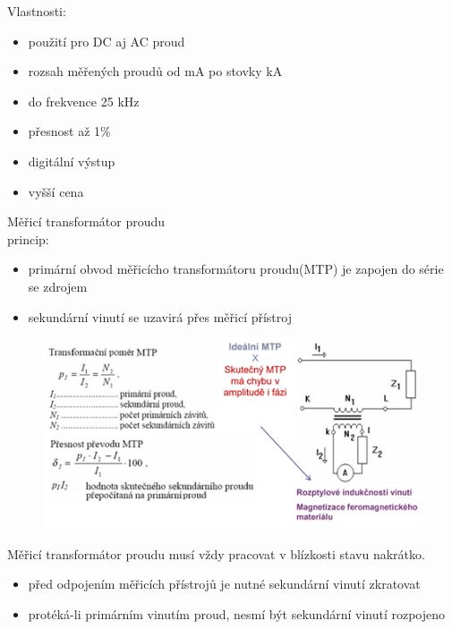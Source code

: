 Vlastnosti:
\begin{itemize}
    \item použití pro DC aj AC proud
    \item rozsah měřených proudů od mA po stovky kA
    \item do frekvence 25 kHz
    \item přesnost až 1\%
    \item digitální výstup
    \item vyšší cena
\end{itemize}
\newpage
Měřicí transformátor proudu\\
princip:
\begin{itemize}
    \item primární obvod měřicícho transformátoru proudu(MTP) je zapojen do série se zdrojem
    \item sekundární vinutí se uzavirá přes měřicí přístroj
\end{itemize}
\begin{figure}[H]
    \includegraphics*[scale = 1.3]{images/proud_transformator.png}
\end{figure}

Měřicí transformátor proudu musí vždy pracovat v blízkosti stavu nakrátko.
\begin{itemize}
    \item před odpojením měřicích přístrojů je nutné sekundární vinutí zkratovat
    \item protéká-li primárním vinutím proud, nesmí být sekundární vinutí rozpojeno
\end{itemize}

